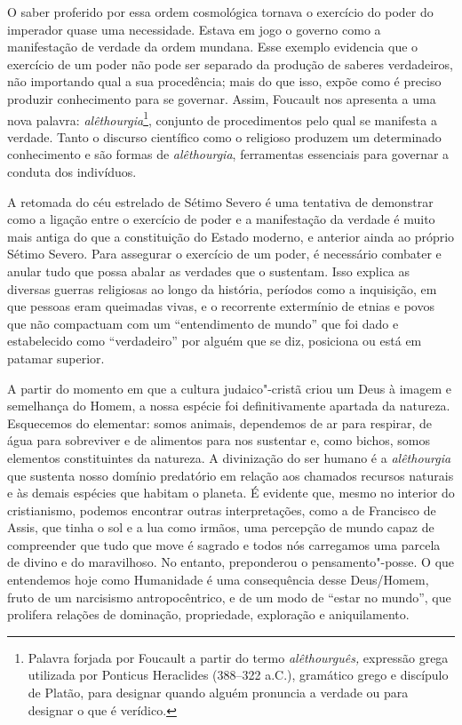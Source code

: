 O saber proferido por essa ordem cosmológica tornava o exercício do
poder do imperador quase uma necessidade. Estava em jogo o governo como
a manifestação de verdade da ordem mundana. Esse exemplo evidencia que o
exercício de um poder não pode ser separado da produção de saberes
verdadeiros, não importando qual a sua procedência; mais do que isso,
expõe como é preciso produzir conhecimento para se governar. Assim,
Foucault nos apresenta a uma nova palavra: \emph{alêthourgia}\footnote{Palavra
  forjada por Foucault a partir do termo \emph{alêthourguês,} expressão
  grega utilizada por Ponticus Heraclides (388--322 a.C.), gramático
  grego e discípulo de Platão, para designar quando alguém pronuncia a
  verdade ou para designar o que é verídico.}, conjunto de procedimentos
pelo qual se manifesta a verdade. Tanto o discurso científico como o
religioso produzem um determinado conhecimento e são formas de
\emph{alêthourgia}, ferramentas essenciais para governar a conduta dos
indivíduos.

A retomada do céu estrelado de Sétimo Severo é uma tentativa de
demonstrar como a ligação entre o exercício de poder e a manifestação da
verdade é muito mais antiga do que a constituição do Estado moderno, e
anterior ainda ao próprio Sétimo Severo. Para assegurar o exercício de
um poder, é necessário combater e anular tudo que possa abalar as
verdades que o sustentam. Isso explica as diversas guerras religiosas ao
longo da história, períodos como a inquisição, em que pessoas eram
queimadas vivas, e o recorrente extermínio de etnias e povos que não
compactuam com um ``entendimento de mundo'' que foi dado e estabelecido
como ``verdadeiro'' por alguém que se diz, posiciona ou está em patamar
superior.

A partir do momento em que a cultura judaico"-cristã criou um Deus à
imagem e semelhança do Homem, a nossa espécie foi definitivamente
apartada da natureza. Esquecemos do elementar: somos animais, dependemos
de ar para respirar, de água para sobreviver e de alimentos para nos
sustentar e, como bichos, somos elementos constituintes da natureza. A
divinização do ser humano é a \emph{alêthourgia} que sustenta nosso
domínio predatório em relação aos chamados recursos naturais e às demais
espécies que habitam o planeta. É evidente que, mesmo no interior do
cristianismo, podemos encontrar outras interpretações, como a de
Francisco de Assis, que tinha o sol e a lua como irmãos, uma percepção
de mundo capaz de compreender que tudo que move é sagrado e todos nós
carregamos uma parcela de divino e do maravilhoso. No entanto,
preponderou o pensamento"-posse. O que entendemos hoje como Humanidade é
uma consequência desse Deus/Homem, fruto de um narcisismo
antropocêntrico, e de um modo de ``estar no mundo'', que prolifera
relações de dominação, propriedade, exploração e aniquilamento.


